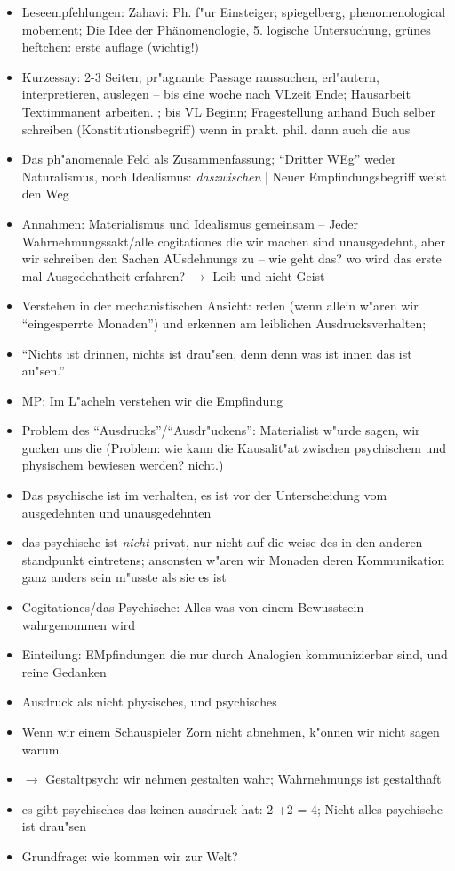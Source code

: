 \documentclass[emulatestandardclasses]{scrartcl}
\begin{document}
\begin{itemize}
  \item Leseempfehlungen: Zahavi: Ph. f"ur Einsteiger; spiegelberg, phenomenological mobement; Die Idee der Phänomenologie, 5. logische Untersuchung, grünes heftchen: erste auflage (wichtig!)
  \item Kurzessay: 2-3 Seiten; pr"agnante Passage raussuchen, erl"autern, interpretieren, auslegen -- bis eine woche nach VLzeit Ende; Hausarbeit Textimmanent arbeiten. ; bis VL Beginn; Fragestellung anhand Buch selber schreiben (Konstitutionsbegriff) wenn in prakt. phil. dann auch die aus
  \item Das ph"anomenale Feld als Zusammenfassung; "`Dritter WEg"' weder Naturalismus, noch Idealismus: \emph{daszwischen} | Neuer Empfindungsbegriff weist den Weg
  \item Annahmen: Materialismus und Idealismus gemeinsam -- Jeder Wahrnehmungssakt/alle cogitationes die wir machen sind unausgedehnt, aber wir schreiben den Sachen AUsdehnungs zu -- wie geht das? wo wird das erste mal Ausgedehntheit erfahren? $\rightarrow$ Leib und nicht Geist
  \item Verstehen in der mechanistischen Ansicht: reden (wenn allein w"aren wir "`eingesperrte Monaden"') und erkennen am leiblichen Ausdrucksverhalten; 
  \item "`Nichts ist drinnen, nichts ist drau"sen, denn denn was ist innen das ist au"sen."'
  \item MP: Im L"acheln verstehen wir die Empfindung
  \item Problem des "`Ausdrucks"'/"`Ausdr"uckens"': Materialist w"urde sagen, wir gucken uns die (Problem: wie kann die Kausalit"at zwischen psychischem und physischem bewiesen werden? nicht.)
  \item Das psychische ist im verhalten, es ist vor der Unterscheidung vom ausgedehnten und unausgedehnten
  \item das psychische ist \emph{nicht} privat, nur nicht auf die weise des in den anderen standpunkt eintretens; ansonsten w"aren wir Monaden deren Kommunikation ganz anders sein m"usste als sie es ist
  \item Cogitationes/das Psychische: Alles was von einem Bewusstsein wahrgenommen wird
  \item Einteilung: EMpfindungen die nur durch Analogien kommunizierbar sind, und reine Gedanken 
  \item Ausdruck als nicht physisches, und psychisches
  \item Wenn wir einem Schauspieler Zorn nicht abnehmen, k"onnen wir nicht sagen warum
  \item $\rightarrow$ Gestaltpsych: wir nehmen gestalten wahr; Wahrnehmungs ist gestalthaft
  \item es gibt psychisches das keinen ausdruck hat: 2 +2 = 4; Nicht alles psychische ist drau"sen
  \item Grundfrage: wie kommen wir zur Welt? 
\end{itemize}
\end{document}
